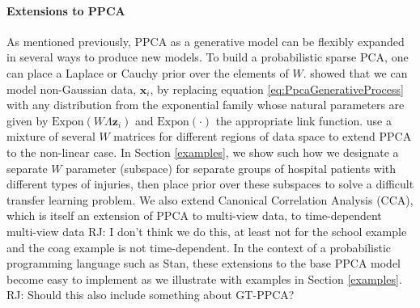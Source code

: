 \documentclass{article}
\newcommand{\commentRJ}[1]{{\textcolor{commentRJ_color}{RJ: #1}}}
\newcommand{\mb}[1]{\mathbf{#1}}
\begin{document}
\paragraph{Extensions to PPCA}
As mentioned previously, PPCA as a generative model can be flexibly expanded in several ways to produce new models. To build a probabilistic sparse PCA, one can place a Laplace or Cauchy prior over the elements of $W$. \citet{mohamed2009bayesian} showed that we can model non-Gaussian data, $\mb{x}_i$, by replacing equation \ref{eq:PpcaGenerativeProcess} with any distribution from the exponential family whose natural parameters are given by $\mathrm{Expon}(W\Lambda \mb{z}_i)$ and $\mathrm{Expon}(\cdot)$ the appropriate link function.\citet{ghahramani1996algorithm} use a mixture of several $W$ matrices for different regions of data space to extend PPCA to the non-linear case. In Section \ref{examples}, we show such how we designate a separate $W$ parameter (subspace) for separate groups of hospital patients with different types of injuries, then place prior over these subspaces to solve a difficult transfer learning problem. We also extend Canonical Correlation Analysis (CCA), which is itself an extension of PPCA to multi-view data, to time-dependent multi-view data \commentRJ{I don't think we do this, at least not for the school example and the coag example is not time-dependent}. In the context of a probabilistic programming language such as Stan, these extensions to the base PPCA model become easy to implement as we illustrate with examples in Section \ref{examples}. \commentRJ{Should this also include something about GT-PPCA?}
\end{document}
